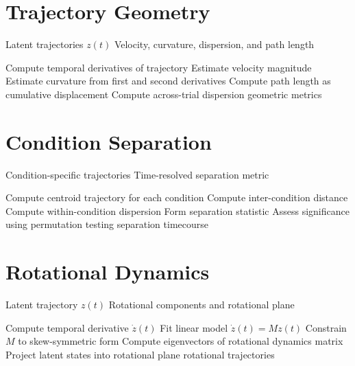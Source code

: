 \documentclass[11pt]{report}
\begin{document}
\section{Trajectory Geometry}

\begin{algorithm}[H]
\caption{Trajectory geometry metrics}
\begin{algorithmic}[1]
\Require Latent trajectories $z(t)$
\Ensure Velocity, curvature, dispersion, and path length

\State Compute temporal derivatives of trajectory
\State Estimate velocity magnitude
\State Estimate curvature from first and second derivatives
\State Compute path length as cumulative displacement
\State Compute across-trial dispersion
\State \Return geometric metrics
\end{algorithmic}
\end{algorithm}

\section{Condition Separation}

\begin{algorithm}[H]
\caption{Condition separation in latent space}
\begin{algorithmic}[1]
\Require Condition-specific trajectories
\Ensure Time-resolved separation metric

\State Compute centroid trajectory for each condition
    \State Compute inter-condition distance
    \State Compute within-condition dispersion
    \State Form separation statistic
\EndFor
\State Assess significance using permutation testing
\State \Return separation timecourse
\end{algorithmic}
\end{algorithm}

\section{Rotational Dynamics}

\begin{algorithm}[H]
\caption{jPCA-based rotational dynamics analysis}
\begin{algorithmic}[1]
\Require Latent trajectory $z(t)$
\Ensure Rotational components and rotational plane

\State Compute temporal derivative $\dot{z}(t)$
\State Fit linear model $\dot{z}(t)=Mz(t)$
\State Constrain $M$ to skew-symmetric form
\State Compute eigenvectors of rotational dynamics matrix
\State Project latent states into rotational plane
\State \Return rotational trajectories
\end{algorithmic}
\end{algorithm}
\end{document}
